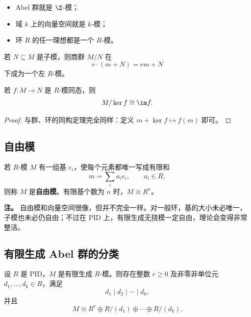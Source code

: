 \begin{example}
\begin{itemize}
  \item Abel 群就是 $\Z$-模；
  \item 域 $k$ 上的向量空间就是 $k$-模；
  \item 环 $R$ 的任一理想都是一个 $R$-模。
\end{itemize}
\end{example}

\begin{definition}[商模]
若 $N\subseteq M$ 是子模，则商群 $M/N$ 在
\[
  r\cdot (m+N)=rm+N
\]
下成为一个左 $R$-模。
\end{definition}

\begin{theorem}[第一同构定理]
若 $f\colon M\to N$ 是 $R$-模同态，则
\begin{equation}
  M/\ker f\cong \im f.
\end{equation}
\end{theorem}

\begin{proof}
与群、环的同构定理完全同样：定义 $m+\ker f\mapsto f(m)$ 即可。
\end{proof}

\subsection{自由模}

\begin{definition}[自由模]
若 $R$-模 $M$ 有一组基 $e_i$，使每个元素都唯一写成有限和
\[
  m=\sum_i a_i e_i,
  \qquad a_i\in R,
\]
则称 $M$ 是\textbf{自由模}。有限基个数为 $n$ 时，$M\cong R^n$。
\end{definition}

\textbf{注。} 自由模和向量空间很像，但并不完全一样。对一般环，基的大小未必唯一，
子模也未必仍自由；不过在 PID 上，有限生成无挠模一定自由，理论会变得非常整洁。

\subsection{有限生成 Abel 群的分类}

\begin{theorem}
设 $R$ 是 PID，$M$ 是有限生成 $R$-模。则存在整数 $r\ge 0$ 及非零非单位元
$d_1,\dots,d_k\in R$，满足
\begin{equation}
  d_1\mid d_2\mid \cdots \mid d_k,
\end{equation}
并且
\begin{equation}
  M\cong R^r\oplus R/(d_1)\oplus\cdots\oplus R/(d_k).
\end{equation}
\end{theorem}

